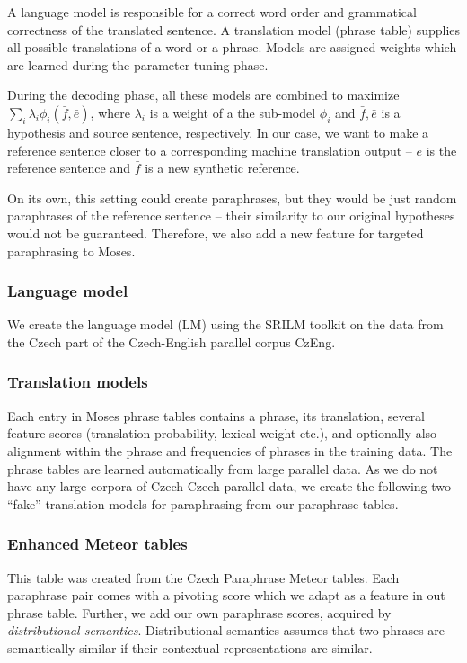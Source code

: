 \documentclass[11pt]{article}
\begin{document}
A language model is responsible for a correct word order and grammatical 
correctness of the translated sentence. A translation model (phrase table) 
supplies all possible translations of a word or a phrase. Models are assigned 
weights which are learned during the parameter tuning phase.

During the decoding phase, all these models are combined to maximize 
$ \sum_i \lambda_i \phi_i (\bar{f},\bar{e}) $, where  $ \lambda_i $ is a weight 
of a the sub-model $ \phi_i $ and $ \bar{f},\bar{e} $ is a hypothesis and 
source sentence, respectively. In our case, we want to make a reference 
sentence closer to a corresponding machine translation output -- $ \bar{e} $ is 
the reference sentence and $ \bar{f} $ is a new synthetic reference.

On its own, this setting could create paraphrases, but they would be just 
random paraphrases of the reference sentence -- their similarity to our 
original hypotheses would not be guaranteed. Therefore, we also add a new 
feature for targeted paraphrasing to Moses.

\subsubsection{Language model}
We create the language model (LM) using the SRILM toolkit \cite{srilm} on the 
data from the Czech part of the Czech-English parallel corpus CzEng. 

\subsubsection{Translation models}
Each entry in Moses phrase tables contains a phrase, its translation, several
feature scores (translation probability, lexical weight etc.), and optionally
also alignment within the phrase and frequencies of phrases in the training 
data. The phrase tables are learned automatically from large parallel data.
As we do not have any large corpora of Czech-Czech parallel data, we create the 
following two ``fake'' translation models for paraphrasing from our paraphrase 
tables. 

\subsubsection*{Enhanced Meteor tables}
This table was created from the Czech Paraphrase Meteor tables. Each paraphrase 
pair comes with a pivoting score which we adapt as a feature in out phrase 
table. Further, we add our own paraphrase scores, acquired by 
\textit{distributional semantics}. Distributional semantics assumes that two 
phrases are semantically similar if their contextual representations are 
similar. \cite{miller-91}
\end{document}
